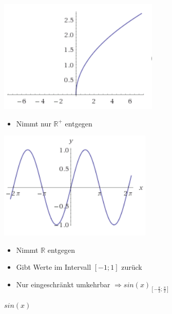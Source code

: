 \begin{figure}[ht!]
	\centering
	\begin{minipage}[t]{0.4\textwidth}
		\centering
		\includegraphics[width=\textwidth]{images/graph_sqrt_x}
		\caption{$\sqrt{x}$}
		\begin{itemize}
			\item Nimmt nur $\mathbb{R^{+}}$ entgegen
		\end{itemize}
	\end{minipage}
	\begin{minipage}[t]{0.4\textwidth}
		\centering
		\includegraphics[width=\textwidth]{images/graph_sin_x}
		\caption{$sin(x)$}
		\begin{itemize}
			\item Nimmt $\mathbb{R}$ entgegen
			\item Gibt Werte im Intervall $\left[-1;1\right]$ zurück
			\item Nur eingeschränkt umkehrbar $\Rightarrow sin(x)_{[-\frac{\pi}{2};\frac{\pi}{2}]}$
		\end{itemize}
	\end{minipage}
\end{figure}

